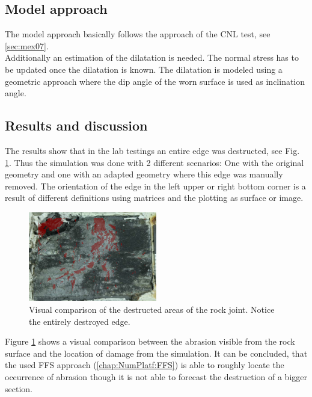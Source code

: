 \subsection{Model approach}
The model approach basically follows the approach of the CNL test, see \ref{sec:mex07}.\\
Additionally an estimation of the dilatation is needed. The normal stress has to be updated once the dilatation is known. The dilatation is modeled using a geometric approach where the dip angle of the worn surface is used as inclination angle.

\subsection{Results and discussion}
The results show that in the lab testings an entire edge was destructed, see Fig. \ref{fig:MEX3-2_AbrasionPic}. Thus the simulation was done with 2 different scenarios: One with the original geometry and one with an adapted geometry where this edge was manually removed. The orientation of the edge in the left upper or right bottom corner is a result of different definitions using matrices and the plotting as surface or image.\\
\begin{figure}[!ht]
\begin{center}
\includegraphics[width=0.5\textwidth]{./figures/MEX3-2_AbrasionPicVsSim.PNG}
\end{center}
\caption{Visual comparison of the destructed areas of the rock joint. Notice the entirely destroyed edge.}
\label{fig:MEX3-2_AbrasionPic}
\end{figure}

Figure \ref{fig:MEX3-2_AbrasionPic} shows a visual comparison between the abrasion visible from the rock surface and the location of damage from the simulation. It can be concluded, that the used FFS approach (\ref{chap:NumPlatf:FFS}) is able to roughly locate the occurrence of abrasion though it is not able to forecast the destruction of a bigger section.\\

